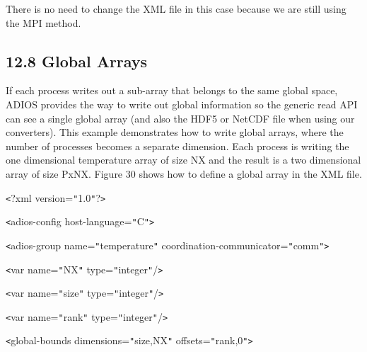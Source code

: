 \vspace{10pt}
There is no need to change the XML file in this case because we are still using 
the MPI method. \label{HToc84890299}\label{HToc212016675}\label{HToc212016917}\label{HRef119999389}\label{HToc182553447}

\vspace{10pt}
\subsection*{{\large 12.8 }{\large \textbf{Global Arrays\label{HToc212016676}\label{HToc212016799}\label{HToc212016918}\label{HToc212018072}}}}

\vspace{10pt}
If each process writes out a sub-array that belongs to the same global space, ADIOS 
provides the way to write out global information so the generic read API can see 
a single global array (and also the HDF5 or NetCDF file when using our converters). 
This example demonstrates how to write global arrays, where the number of processes 
becomes a separate dimension. Each process is writing the one dimensional temperature 
array of size NX and the result is a two dimensional array of size PxNX. Figure 
30 shows how to define a global array in the XML file. 

\vspace{22pt}
\texttt{<}?xml version=\texttt{"}1.0\texttt{"}?\texttt{>}

\vspace{10pt}
\texttt{<}adios-config host-language=\texttt{"}C\texttt{"}\texttt{>}

\vspace{10pt}
\parindent=14pt
\texttt{<}adios-group name=\texttt{"}temperature\texttt{"} coordination-communicator=\texttt{"}comm\texttt{"}\texttt{>}

\vspace{10pt}
\parindent=28pt
\texttt{<}var name=\texttt{"}NX\texttt{"} type=\texttt{"}integer\texttt{"}/\texttt{>}

\vspace{10pt}
\texttt{<}var name=\texttt{"}size\texttt{"} type=\texttt{"}integer\texttt{"}/\texttt{>}

\vspace{10pt}
\parindent=57pt
\texttt{<}var name=\texttt{"}rank\texttt{"} type=\texttt{"}integer\texttt{"}/\texttt{>}

\vspace{10pt}
\parindent=0pt
{\color{color02} \texttt{<}global-bounds dimensions=\texttt{"}size,NX\texttt{"} 
offsets=\texttt{"}rank,0\texttt{"}\texttt{>}}

